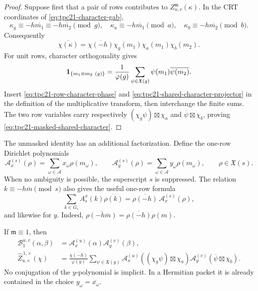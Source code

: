 \begin{proof}
Suppose first that a pair of rows contributes to
\(Z_{u,v}^{\mathfrak m}(\kappa)\).  In the CRT coordinates of
\eqref{eq:tpc21-character-gab},
\[
 \kappa_g\equiv-h\overline{m_1}
             \equiv-h\overline{m_2}\pmod g,
 \quad
 \kappa_a\equiv-h\overline{m_1}\pmod a,
 \quad
 \kappa_b\equiv-h\overline{m_2}\pmod b.
\]
Consequently
\begin{equation}
 \overline{\chi(\kappa)}
 =\overline{\chi(-h)}
  \chi_g(m_1)\chi_a(m_1)\chi_b(m_2).
 \label{eq:tpc21-row-character-phase}
\end{equation}
For unit rows, character orthogonality gives
\begin{equation}
 \mathbf 1_{\{m_1\equiv m_2\ (g)\}}
 =\frac1{\varphi(g)}
  \sum_{\psi\in\mathfrak X(g)}
  \psi(m_1)\overline{\psi(m_2)}.
 \label{eq:tpc21-shared-character-projector}
\end{equation}
Insert \eqref{eq:tpc21-row-character-phase} and
\eqref{eq:tpc21-shared-character-projector} in the definition of the
multiplicative transform, then interchange the finite sums.  The two
row variables carry respectively
\((\chi_g\psi)\boxtimes\chi_a\) and
\(\overline\psi\boxtimes\chi_b\), proving
\eqref{eq:tpc21-masked-shared-character}.
\end{proof}

The unmasked identity has an additional factorization.  Define the
one-row Dirichlet polynomials
\begin{equation}
 \mathcal A_x^{(s)}(\rho)
 =\sum_{\omega\in\mathcal A}x_\omega\rho(m_\omega),
 \qquad
 \mathcal A_y^{(s)}(\rho)
 =\sum_{\omega\in\mathcal A}y_\omega\rho(m_\omega),
 \qquad \rho\in\mathfrak X(s).
 \label{eq:tpc21-row-Dirichlet-polynomials}
\end{equation}
When no ambiguity is possible, the superscript \(s\) is suppressed.
The relation \(k\equiv-h\overline m\pmod s\) also gives the useful
one-row formula
\begin{equation}
 \sum_{k\in G_s}A_s^x(k)\overline{\rho(k)}
 =\overline{\rho(-h)}\,\mathcal A_x^{(s)}(\rho),
 \label{eq:tpc21-row-fiber-character}
\end{equation}
and likewise for \(y\).  Indeed,
\(\overline{\rho(-h\overline m)}
=\overline{\rho(-h)}\rho(m)\).

\begin{corollary}
\label{cor:tpc21-unmasked-character-factorization}
If \(\mathfrak m\equiv1\), then
\begin{align}
 \mathcal B_1^{u,v}(\alpha,\beta)
 &=\mathcal A_x^{(u)}(\alpha)
   \mathcal A_y^{(v)}(\beta),
 \label{eq:tpc21-unmasked-B-factorization}\\
 \widehat Z_{u,v}^{\,1,\times}(\chi)
 &=\frac{\overline{\chi(-h)}}{\varphi(g)}
   \sum_{\psi\in\mathfrak X(g)}
   \mathcal A_x^{(u)}
    ((\chi_g\psi)\boxtimes\chi_a)
   \mathcal A_y^{(v)}
    (\overline\psi\boxtimes\chi_b).
 \label{eq:tpc21-unmasked-shared-character}
\end{align}
No conjugation of the \(y\)-polynomial is implicit.  In a Hermitian
packet it is already contained in the choice
\(y_\omega=\overline{x_\omega}\).
\end{corollary}


